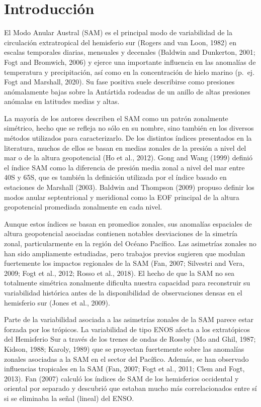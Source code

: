 \documentclass[12pt,oneside]{reedthesis}
\begin{document}
\hypertarget{introducciuxf3n-1}{%
\section{Introducción}\label{introducciuxf3n-1}}

El Modo Anular Austral (SAM) es el principal modo de variabilidad de la circulación extratropical del hemisferio sur (Rogers and van Loon, 1982) en escalas temporales diarias, mensuales y decenales (Baldwin and Dunkerton, 2001; Fogt and Bromwich, 2006) y ejerce una importante influencia en las anomalías de temperatura y precipitación, así como en la concentración de hielo marino (p.~ej. Fogt and Marshall, 2020).
Su fase positiva suele describirse como presiones anómalamente bajas sobre la Antártida rodeadas de un anillo de altas presiones anómalas en latitudes medias y altas.

La mayoría de los autores describen el SAM como un patrón zonalmente simétrico, hecho que se refleja no sólo en su nombre, sino también en los diversos métodos utilizados para caracterizarlo.
De los distintos índices presentados en la literatura, muchos de ellos se basan en medias zonales de la presión a nivel del mar o de la altura geopotencial (Ho et al., 2012).
Gong and Wang (1999) definió el índice SAM como la diferencia de presión media zonal a nivel del mar entre 40\degree S y 65\degree S, que es también la definición utilizada por el índice basado en estaciones de Marshall (2003).
Baldwin and Thompson (2009) propuso definir los modos anular septentrional y meridional como la EOF principal de la altura geopotencial promediada zonalmente en cada nivel.

Aunque estos índices se basan en promedios zonales, sus anomalías espaciales de altura geopotencial asociadas contienen notables desviaciones de la simetría zonal, particularmente en la región del Océano Pacífico.
Las asimetrías zonales no han sido ampliamente estudiadas, pero trabajos previos sugieren que modulan fuertemente los impactos regionales de la SAM (Fan, 2007; Silvestri and Vera, 2009; Fogt et al., 2012; Rosso et al., 2018).
El hecho de que la SAM no sea totalmente simétrica zonalmente dificulta nuestra capacidad para reconstruir su variabilidad histórica antes de la disponibilidad de observaciones densas en el hemisferio sur (Jones et al., 2009).

Parte de la variabilidad asociada a las asimetrías zonales de la SAM parece estar forzada por los trópicos.
La variabilidad de tipo ENOS afecta a los extratópicos del Hemisferio Sur a través de los trenes de ondas de Rossby (Mo and Ghil, 1987; Kidson, 1988; Karoly, 1989) que se proyectan fuertemente sobre las anomalías zonales asociadas a la SAM en el sector del Pacífico.
Además, se han observado influencias tropicales en la SAM (Fan, 2007; Fogt et al., 2011; Clem and Fogt, 2013).
Fan (2007) calculó los índices de SAM de los hemisferios occidental y oriental por separado y descubrió que estaban mucho más correlacionados entre sí si se eliminaba la señal (lineal) del ENSO.
\end{document}

